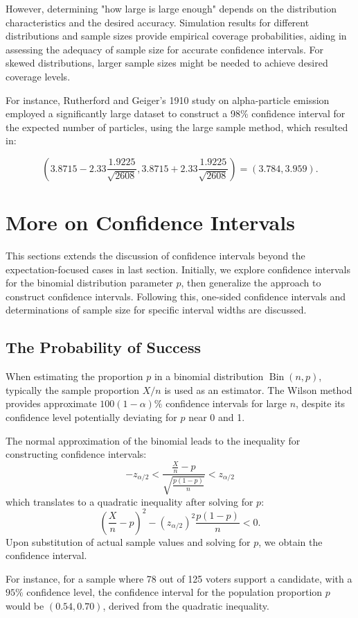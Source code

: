 \documentclass{article}
\begin{document}
However, determining "how large is large enough" depends on the distribution characteristics and the desired accuracy. Simulation results for different distributions and sample sizes provide empirical coverage probabilities, aiding in assessing the adequacy of sample size for accurate confidence intervals. For skewed distributions, larger sample sizes might be needed to achieve desired coverage levels.

For instance, Rutherford and Geiger's 1910 study on alpha-particle emission employed a significantly large dataset to construct a 98\% confidence interval for the expected number of particles, using the large sample method, which resulted in:

\[
\left(3.8715-2.33 \frac{1.9225}{\sqrt{2608}}, 3.8715+2.33 \frac{1.9225}{\sqrt{2608}}\right)=(3.784,3.959).
\]

\section{More on Confidence Intervals}

This sections extends the discussion of confidence intervals beyond the expectation-focused cases in last section. Initially, we explore confidence intervals for the binomial distribution parameter $p$, then generalize the approach to construct confidence intervals. Following this, one-sided confidence intervals and determinations of sample size for specific interval widths are discussed.

\subsection{The Probability of Success}
When estimating the proportion $p$ in a binomial distribution $\operatorname{Bin}(n, p)$, typically the sample proportion $X/n$ is used as an estimator. The Wilson method provides approximate $100(1-\alpha)\%$ confidence intervals for large $n$, despite its confidence level potentially deviating for $p$ near 0 and 1.

The normal approximation of the binomial leads to the inequality for constructing confidence intervals:
\[
-z_{\alpha / 2}<\frac{\frac{X}{n}-p}{\sqrt{\frac{p(1-p)}{n}}}<z_{\alpha / 2}
\]
which translates to a quadratic inequality after solving for $p$:
\[
\left(\frac{X}{n}-p\right)^{2}-\left(z_{\alpha / 2}\right)^{2} \frac{p(1-p)}{n}<0.
\]
Upon substitution of actual sample values and solving for $p$, we obtain the confidence interval.

For instance, for a sample where 78 out of 125 voters support a candidate, with a $95\%$ confidence level, the confidence interval for the population proportion $p$ would be $(0.54,0.70)$, derived from the quadratic inequality.
\end{document}
